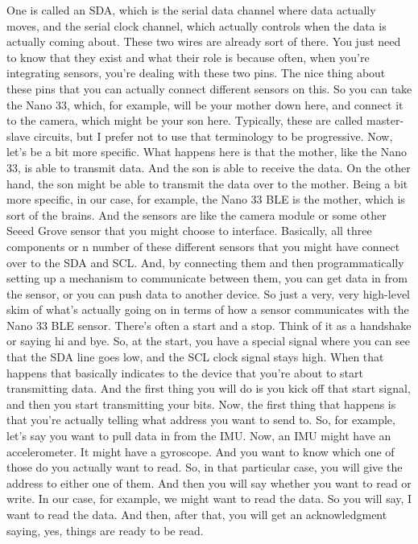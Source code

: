 One is called an SDA, which is the serial data channel where data actually moves, and the serial clock channel, which actually controls when the data is actually coming about.
These two wires are already sort of there.
You just need to know that they exist and what their role is because often, when you're integrating sensors, you're dealing with these two pins.
The nice thing about these pins that you can actually connect different sensors on this.
So you can take the Nano 33, which, for example, will be your mother down here, and connect it to the camera, which might be your son here.
Typically, these are called master-slave circuits, but I prefer not to use that terminology to be progressive.
Now, let's be a bit more specific.
What happens here is that the mother, like the Nano 33, is able to transmit data.
And the son is able to receive the data.
On the other hand, the son might be able to transmit the data over to the mother.
Being a bit more specific, in our case, for example, the Nano 33 BLE is the mother, which is sort of the brains.
And the sensors are like the camera module or some other Seeed Grove sensor that you might choose to interface.
Basically, all three components or n number of these different sensors that you might have connect over to the SDA and SCL.
And, by connecting them and then programmatically setting up a mechanism to communicate between them, you can get data in from the sensor, or you can push data to another device.
So just a very, very high-level skim of what's actually going on in terms of how a sensor communicates with the Nano 33 BLE sensor.
There's often a start and a stop.
Think of it as a handshake or saying hi and bye.
So, at the start, you have a special signal where you can see that the SDA line goes low, and the SCL clock signal stays high.
When that happens that basically indicates to the device that you're about to start transmitting data.
And the first thing you will do is you kick off that start signal, and then you start transmitting your bits.
Now, the first thing that happens is that you're actually telling what address you want to send to.
So, for example, let's say you want to pull data in from the IMU.
Now, an IMU might have an accelerometer.
It might have a gyroscope.
And you want to know which one of those do you actually want to read.
So, in that particular case, you will give the address to either one of them.
And then you will say whether you want to read or write.
In our case, for example, we might want to read the data.
So you will say, I want to read the data.
And then, after that, you will get an acknowledgment saying, yes, things are ready to be read.
